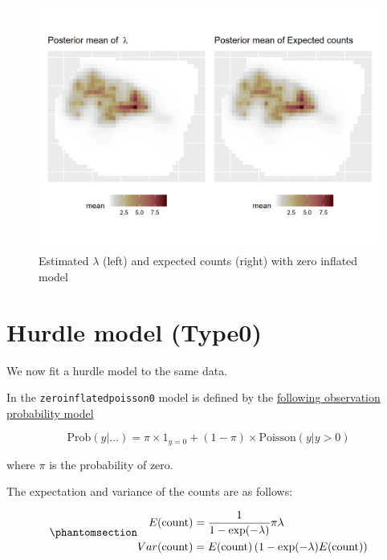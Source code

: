 \documentclass[
  letterpaper,
  DIV=11,
  numbers=noendperiod]{scrartcl}
\begin{document}
\begin{figure}[H]

{\centering \includegraphics[width=0.8\linewidth,height=\textheight,keepaspectratio]{day5_practical_8_files/figure-pdf/unnamed-chunk-73-1.png}

}

\caption{Estimated \(\lambda\) (left) and expected counts (right) with
zero inflated model}

\end{figure}%

\section{Hurdle model (Type0)}\label{sec-zap}

We now fit a hurdle model to the same data.

In the \texttt{zeroinflatedpoisson0} model is defined by the
\href{https://inla.r-inla-download.org/r-inla.org/doc/likelihood/zeroinflated.pdf}{following
observation probability model}

\[
\text{Prob}(y\vert\dots)=\pi\times 1_{y=0}+(1-\pi)\times \text{Poisson}(y\vert y>0)
\]

where \(\pi\) is the probability of zero.

The expectation and variance of the counts are as follows:

\begin{equation}\phantomsection\label{eq-mean-zap}{
\begin{aligned}
E(\text{count})&=\frac{1}{1-\exp(-\lambda)}\pi\lambda \\
Var(\text{count})&=  E(\text{count}) \left(1-\exp(-\lambda) E(\text{count})\right)
\end{aligned}
}\end{equation}
\end{document}
